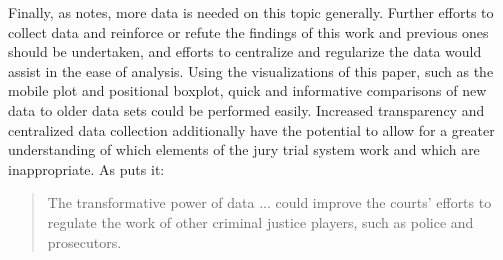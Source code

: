 Finally, as \cite{JurySunshineProj} notes, more data is needed on this topic generally. Further efforts to collect data and
reinforce or refute the findings of this work and previous ones should be undertaken, and efforts to centralize and regularize the
data would assist in the ease of analysis. Using the visualizations of
this paper, such as the mobile plot and positional boxplot, quick and
informative comparisons of new data to older data sets could be
performed easily. Increased transparency and
centralized data collection additionally have the potential to allow for a greater understanding of which elements of the jury
trial system work and which are inappropriate. As \citeauthor{JurySunshineProj} puts it:

\begin{quote}
  The transformative power of data ... could improve the courts' efforts to regulate the work of other
  criminal justice players, such as police and prosecutors.
\end{quote}

